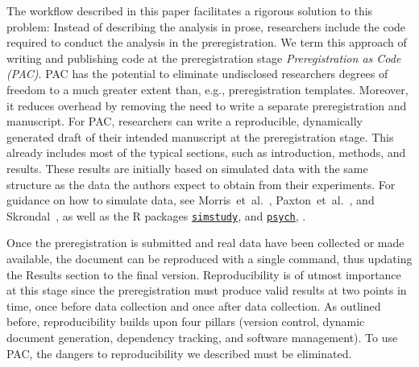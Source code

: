 \documentclass[psych,tutorial,accept,moreauthors,pdftex]{Definitions/mdpi}
\begin{document}
\begin{paracol}{2}
The workflow described in this paper facilitates a rigorous solution to
this problem: Instead of describing the analysis in prose, researchers
include the code required to conduct the analysis in the
preregistration. We term this approach of writing and publishing code at
the preregistration stage \emph{Preregistration as Code (PAC)}. PAC has
the potential to eliminate undisclosed researchers degrees of freedom to
a much greater extent than, e.g., preregistration templates. Moreover,
it reduces overhead by removing the need to write a separate
preregistration and manuscript. For PAC, researchers can write a
reproducible, dynamically generated draft of their intended manuscript
at the preregistration stage. This already includes most of the typical
sections, such as introduction, methods, and results. These results are
initially based on simulated data with the same structure as the data
the authors expect to obtain from their experiments. For guidance on how
to simulate data, see Morris~et~al.~\citep{morrisUsingSimulationStudies2019},
Paxton~et~al.~\citep{paxtonMonteCarloExperiments2001}, and
Skrondal~\citep{skrondalDesignAnalysisMonte2000}, as well as the R packages
\href{https://cran.r-project.org/web/packages/simstudy/vignettes/simstudy.html}{\texttt{simstudy}},
\citep{simstudy} and
\href{https://personality-project.org/r/psych/help/sim.html}{\texttt{psych}},
\citep{psych}.

Once the preregistration is submitted and real data have been collected
or made available, the document can be reproduced with a single command,
thus updating the Results section to the final version. Reproducibility
is of utmost importance at this stage since the preregistration must
produce valid results at two points in time, once before data collection
and once after data collection. As outlined before, reproducibility
builds upon four pillars (version control, dynamic document generation,
dependency tracking, and software management). To use PAC, the dangers to
reproducibility we described must be eliminated.



\end{paracol}
\end{document}
